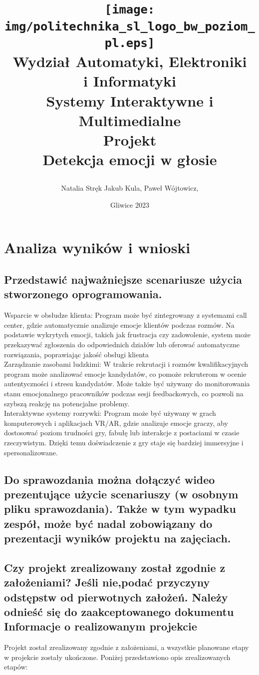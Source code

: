 \documentclass[12pt,titlepage]{article}
\title{
\texttt{[image: img/politechnika\_sl\_logo\_bw\_poziom\_pl.eps]}\\
\textbf{Wydział Automatyki, Elektroniki\\
i Informatyki}\\
\vspace*{1cm}
Systemy Interaktywne i Multimedialne \\ Projekt \\ Detekcja emocji w głosie

\vspace*{5cm}
}
\author{
Natalia Stręk
Jakub Kula,
Paweł Wójtowicz,
}
\date{Gliwice 2023}
\begin{document}
\maketitle


\newpage
\section{Analiza wyników i wnioski}
\subsection{Przedstawić najważniejsze scenariusze użycia stworzonego oprogramowania.}
Wsparcie w obsłudze klienta:
Program może być zintegrowany z systemami call center, gdzie automatycznie analizuje emocje klientów podczas rozmów. Na podstawie wykrytych emocji, takich jak frustracja czy zadowolenie, system może przekazywać zgłoszenia do odpowiednich działów lub oferować automatyczne rozwiązania, poprawiając jakość obsługi klienta\\

Zarządzanie zasobami ludzkimi:
W trakcie rekrutacji i rozmów kwalifikacyjnych program może analizować emocje kandydatów, co pomoże rekruterom w ocenie autentyczności i stresu kandydatów. Może także być używany do monitorowania stanu emocjonalnego pracowników podczas sesji feedbackowych, co pozwoli na szybszą reakcję na potencjalne problemy.\\

Interaktywne systemy rozrywki:
Program może być używany w grach komputerowych i aplikacjach VR/AR, gdzie analizuje emocje graczy, aby dostosować poziom trudności gry, fabułę lub interakcje z postaciami w czasie rzeczywistym. Dzięki temu doświadczenie z gry staje się bardziej immersyjne i spersonalizowane.\\

\subsection{Do sprawozdania można dołączyć wideo prezentujące użycie scenariuszy (w osobnym pliku sprawozdania). Także w tym wypadku zespół, może być nadal zobowiązany do prezentacji wyników projektu na zajęciach.}

\subsection{Czy projekt zrealizowany został zgodnie z założeniami? Jeśli nie,podać przyczyny odstępstw od pierwotnych założeń. Należy odnieść się do zaakceptowanego dokumentu Informacje o realizowanym projekcie}
Projekt został zrealizowany zgodnie z założeniami, a wszystkie planowane etapy w projekcie zostały ukończone. Poniżej przedstawiono opis zrealizowanych etapów:
\end{document}
